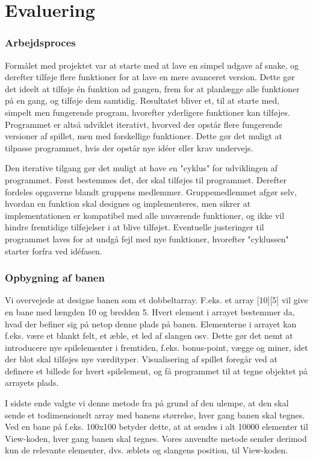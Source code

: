 \section{Evaluering}
 
\subsubsection{Arbejdsproces}
Formålet med projektet var at starte med at lave en simpel udgave af snake, og derefter tilføje flere funktioner for at lave en mere avanceret version. Dette gør det ideelt at tilføje én funktion ad gangen, frem for at planlægge alle funktioner på en gang, og tilføje dem samtidig. Resultatet bliver et, til at starte med, simpelt men fungerende program, hvorefter yderligere funktioner kan tilføjes. Programmet er altså udviklet iterativt, hvorved der opstår flere fungerende versioner af spillet, men med forskellige funktioner. Dette gør det muligt at tilpasse programmet, hvis der opstår nye idéer eller krav undervejs. 
 
Den iterative tilgang gør det muligt at have en "cyklus" for udviklingen af programmet. Først bestemmes det, der skal tilføjes til programmet. Derefter fordeles opgaverne blandt gruppens medlemmer. Gruppemedlemmet afgør selv, hvordan en funktion skal designes og implementeres, men sikrer at implementationen er kompatibel med alle nuværende funktioner, og ikke vil hindre fremtidige tilføjelser i at blive tilføjet. Eventuelle justeringer til programmet laves for at undgå fejl med nye funktioner, hvorefter "cyklussen" starter forfra ved idéfasen.

\subsubsection{Opbygning af banen}
Vi overvejede at designe banen som et dobbeltarray. F.eks. et array [10][5] vil give en bane med længden 10 og bredden 5. Hvert element i arrayet bestemmer da, hvad der befiner sig på netop denne plads på banen. Elementerne i arrayet kan f.eks. være et blankt felt, et æble, et led af slangen osv. Dette gør det nemt at introducere nye spilelementer i fremtiden, f.eks. bonus-point, vægge og miner, idet der blot skal tilføjes nye værdityper. Visualisering af spillet foregår ved at definere et billede for hvert spilelement, og få programmet til at tegne objektet på arrayets plads.

I sidste ende valgte vi denne metode fra på grund af den ulempe, at den skal sende et todimensionelt array med banens størrelse, hver gang banen skal tegnes. Ved en bane på f.eks. 100x100 betyder dette, at at sendes i alt 10000 elementer til View-koden, hver gang banen skal tegnes. Vores anvendte metode sender derimod kun de relevante elementer, dvs. æblets og slangens position, til View-koden.

